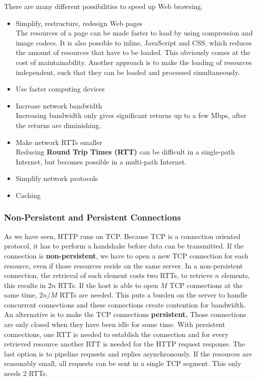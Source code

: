 There are many different possibilities to speed up Web browsing.
\begin{itemize}
\item Simplify, restructure, redesign Web pages\\
The resources of a page can be made faster to load by using compression and image codecs. It is also possible to inline, JavaScript and CSS, which reduces the amount of resources that have to be loaded. This obviously comes at the cost of maintainability. Another approach is to make the loading of resources independent, such that they can be loaded and processed simultaneously.
\item Use faster computing devices
\item Increase network bandwidth\\
Increasing bandwidth only gives significant returns up to a few Mbps, after the returns are diminishing.
\item Make network RTTs smaller\\
Reducing \textbf{Round Trip Times (RTT)} can be difficult in a single-path Internet, but becomes possible in a multi-path Internet.
\item Simplify network protocols
\item Caching
\end{itemize}

\subsubsection{Non-Persistent and Persistent Connections}
As we have seen, HTTP runs on TCP. Because TCP is a connection oriented protocol, it has to perform a handshake before data can be transmitted. If the connection is \textbf{non-persistent}, we have to open a new TCP connection for each resource, even if those resources reside on the same server. In a non-persistent connection, the retrieval of each element costs two RTTs, to retrieve $n$ elements, this results in $2n$ RTTs. If the host is able to open $M$ TCP connections at the same time, $2n/M$ RTTs are needed. This puts a burden on the server to handle concurrent connections and these connections create contention for bandwidth.\\
An alternative is to make the TCP connections \textbf{persistent.} Those connections are only closed when they have been idle for some time. With persistent connections, one RTT is needed to establish the connection and for every retrieved resource another RTT is needed for the HTTP request response. The last option is to pipeline requests and replies asynchronously. If the resources are reasonably small, all requests can be sent in a single TCP segment. This only needs 2 RTTs.

